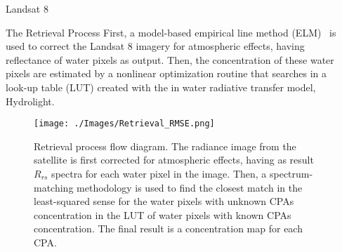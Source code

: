 \documentclass{beamer}
\begin{document}
\begin{frame}{}
\begin{columns}[t]
\begin{column}{.3\linewidth}
\begin{block}{Landsat 8}
\vspace{-.5cm}
\end{block}
\begin{block}{The Retrieval Process}
\justifying\small First, a model-based empirical line method (ELM)~\cite{Concha2014SPIE} is used to correct the Landsat 8 imagery for atmospheric effects, having reflectance of water pixels as output. Then, the concentration of these water pixels are estimated by a nonlinear optimization routine that searches in a look-up table (LUT) created with the in water radiative transfer model, Hydrolight.
\vspace{1cm}   
\begin{center}
\begin{figure}[htbp!]
  \centering
    \texttt{[image: ./Images/Retrieval\_RMSE.png]}
    \caption{Retrieval process flow diagram. The radiance image from the satellite is first corrected for atmospheric effects, having as result $R_{rs}$ spectra for each water pixel in the image. Then, a spectrum-matching methodology is used to find the closest match in the least-squared sense for the water pixels with unknown CPAs concentration in the LUT of water pixels with known CPAs concentration. The final result is a concentration map for each CPA.  \label{fig:retrieval} }
\end{figure}

\end{center}
\end{block}




\end{column}   

 \begin{column}{.3\linewidth}  %


\end{column}
\end{columns}
\end{frame}
\end{document}
